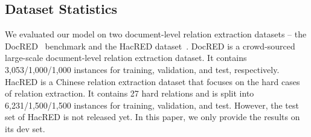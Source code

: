 \documentclass[11pt]{article}
\begin{document}
\subsection{Dataset Statistics}
We evaluated our model on two document-level relation extraction datasets -- the DocRED~\citep{yao2019docred} benchmark and the HacRED dataset~\citep{cheng-etal-2021-hacred}. DocRED is a crowd-sourced large-scale document-level relation extraction dataset. It contains 3,053/1,000/1,000 instances for training,
validation, and test, respectively. HacRED is a Chinese relation extraction dataset that focuses on the hard cases of relation extraction. It contains 27 hard relations and is split into 6,231/1,500/1,500 instances for training, validation, and test. However, the test set of HacRED is not released yet. In this paper, we only provide the results on its dev set.
\end{document}
